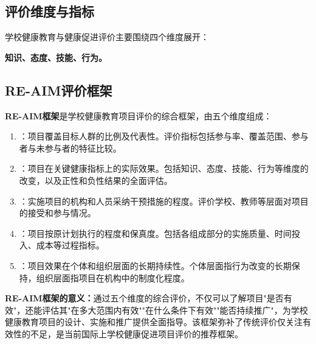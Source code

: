 \subsection{评价维度与指标}

\begin{defbox}
学校健康教育与健康促进评价主要围绕四个维度展开：

\textbf{知识、态度、技能、行为。}
\end{defbox}

\subsection{RE-AIM评价框架}

\begin{keybox}
\textbf{RE-AIM框架}是学校健康教育项目评价的综合框架，由五个维度组成：

\begin{enumerate}[leftmargin=*]
    \item {}：项目覆盖目标人群的比例及代表性。评价指标包括参与率、覆盖范围、参与者与未参与者的特征比较。

    \item {}：项目在关键健康指标上的实际效果。包括知识、态度、技能、行为等维度的改变，以及正性和负性结果的全面评估。

    \item {}：实施项目的机构和人员采纳干预措施的程度。评价学校、教师等层面对项目的接受和参与情况。

    \item {}：项目按原计划执行的程度和保真度。包括各组成部分的实施质量、时间投入、成本等过程指标。

    \item {}：项目效果在个体和组织层面的长期持续性。个体层面指行为改变的长期保持，组织层面指项目在机构中的制度化程度。
\end{enumerate}

\textbf{RE-AIM框架的意义：}通过五个维度的综合评价，不仅可以了解项目"是否有效"，还能评估其"在多大范围内有效""在什么条件下有效""能否持续推广"，为学校健康教育项目的设计、实施和推广提供全面指导。该框架弥补了传统评价仅关注有效性的不足，是当前国际上学校健康促进项目评价的推荐框架。
\end{keybox}

\newpage
